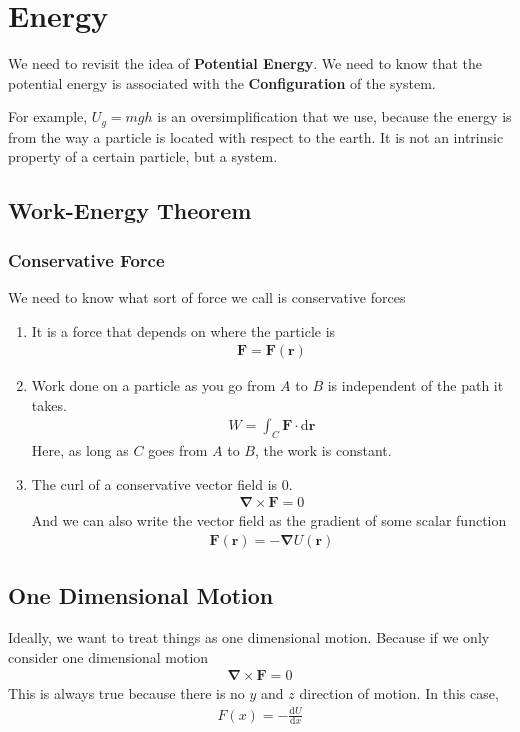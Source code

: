 \documentclass[12pt]{article}
\newcommand{\curl}{\boldsymbol{\nabla}\times}
\newcommand{\dydx}[2]{\frac{\text{d} #1}{\text{d} #2}}
\begin{document}
\section{Energy}
We need to revisit the idea of \textbf{Potential Energy}. We need to know that the potential energy is associated with the \textbf{Configuration} of the system.

For example, $U_g = mgh$ is an oversimplification that we use, because the energy is from the way a particle is located with respect to the earth. It is not an intrinsic property of a certain particle, but a system.

\subsection{Work-Energy Theorem}
\subsubsection{Conservative Force}
We need to know what sort of force we call is conservative forces
\begin{enumerate}
    \item It is a force that depends on where the particle is
    \begin{align}
    \mathbf{F} = \mathbf{F}(\mathbf{r})
    \end{align}
    
    \item Work done on a particle as you go from $A$ to $B$ is independent of the path it takes. 
    \begin{align}
    W = \int_C \mathbf{F}\cdot \text{d}\mathbf{r}
    \end{align}
    Here, as long as $C$ goes from $A$ to $B$, the work is constant. 
    
    \item The curl of a conservative vector field is $0$.
    \begin{align}
    \curl \mathbf{F} = 0
    \end{align}
    And we can also write the vector field as the gradient of some scalar function
    \begin{align}
    \mathbf{F}(\mathbf{r}) = -\boldsymbol{\nabla}U(\mathbf{r})
    \end{align}
\end{enumerate}

\subsection{One Dimensional Motion}
Ideally, we want to treat things as one dimensional motion. Because if we only consider one dimensional motion
\begin{align}
\curl \mathbf{F} = 0
\end{align}
This is always true because there is no $y$ and $z$ direction of motion. In this case, 
\begin{align}
F(x) = -\dydx{U}{x}
\end{align}
\end{document}
